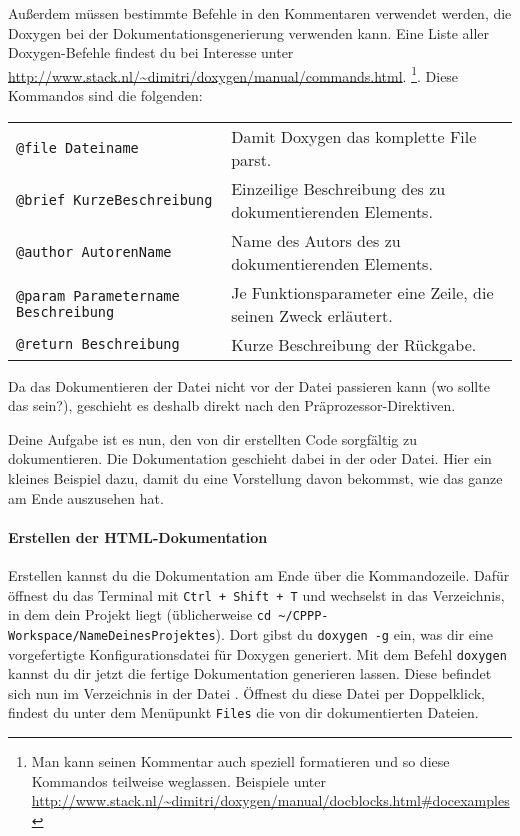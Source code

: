 Außerdem müssen bestimmte Befehle in den Kommentaren verwendet werden, die Doxygen bei der Dokumentationsgenerierung verwenden kann.
Eine Liste aller Doxygen-Befehle findest du bei Interesse unter \url{http://www.stack.nl/~dimitri/doxygen/manual/commands.html}.
\footnote{Man kann seinen Kommentar auch speziell formatieren und so diese Kommandos teilweise weglassen.
Beispiele unter \url{http://www.stack.nl/~dimitri/doxygen/manual/docblocks.html\#docexamples}}.
Diese Kommandos sind die folgenden:

\medskip
    \begin{tabular}{ll}
        {\lstinline!@file Dateiname!} & Damit Doxygen das komplette File parst. \\
        {\lstinline!@brief KurzeBeschreibung!} & Einzeilige Beschreibung des zu dokumentierenden Elements. \\
        {\lstinline!@author AutorenName!} & Name des Autors des zu dokumentierenden Elements. \\
        {\lstinline!@param Parametername Beschreibung!} & Je Funktionsparameter eine Zeile, die seinen Zweck erläutert. \\
        {\lstinline!@return Beschreibung!} & Kurze Beschreibung der Rückgabe. \\
    \end{tabular}
\medskip

Da das Dokumentieren der Datei nicht vor der Datei passieren kann (wo sollte das sein?), geschieht es deshalb direkt nach den Präprozessor-Direktiven.

Deine Aufgabe ist es nun, den von dir erstellten Code sorgfältig zu dokumentieren.
Die Dokumentation geschieht dabei in der  oder  Datei. 
Hier ein kleines Beispiel dazu, damit du eine Vorstellung davon bekommst, wie das ganze am Ende auszusehen hat.


\paragraph{Erstellen der HTML-Dokumentation}
Erstellen kannst du die Dokumentation am Ende über die Kommandozeile.
Dafür öffnest du das Terminal mit \lstinline{Ctrl + Shift + T} und wechselst in das Verzeichnis, in dem dein Projekt liegt (üblicherweise \lstinline{cd ~/CPPP-Workspace/NameDeinesProjektes}).
Dort gibst du \lstinline{doxygen -g} ein, was dir eine vorgefertigte Konfigurationsdatei für Doxygen generiert. 
Mit dem Befehl \lstinline{doxygen} kannst du dir jetzt die fertige Dokumentation generieren lassen.
Diese befindet sich nun im Verzeichnis  in der Datei .
Öffnest du diese Datei per Doppelklick, findest du unter dem Menüpunkt \lstinline{Files} die von dir dokumentierten Dateien.


